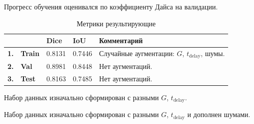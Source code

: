 Прогресс обучения оценивался по коэффициенту Дайса на валидации.

\begin{table}[htbp]
    \caption{Метрики результирующие}
    \label{tbl:dice_iou}
    \begin{threeparttable}
        \begin{tabular}{|l|l|l|l|l|}
            \hline
                    &                & \textbf{Dice} & \textbf{IoU} & \textbf{Комментарий}                                  \\ \hline
            \textbf{1.} & \textbf{Train} & \num{0.8131}        & \num{0.7446}       & Случайные аугментации: $G$, ${t_\text{delay}}$, шумы. \\ \hline
            \textbf{2.} & \textbf{Val}   & \num{0.8981}        & \num{0.8448}       & Нет аугментаций.\tnote{*}                                  \\ \hline
            \textbf{3.} & \textbf{Test}  & \num{0.8163}        & \num{0.7485}       & Нет аугментаций.\tnote{**}                                  \\ \hline
        \end{tabular}
        \begin{tablenotes}
            \small
            \item[*] Набор данных изначально сформирован с разными $G$, ${t_\text{delay}}$.
            \item[**] Набор данных изначально сформирован с разными $G$, ${t_\text{delay}}$ и дополнен шумами.
        \end{tablenotes}
    \end{threeparttable}
\end{table}